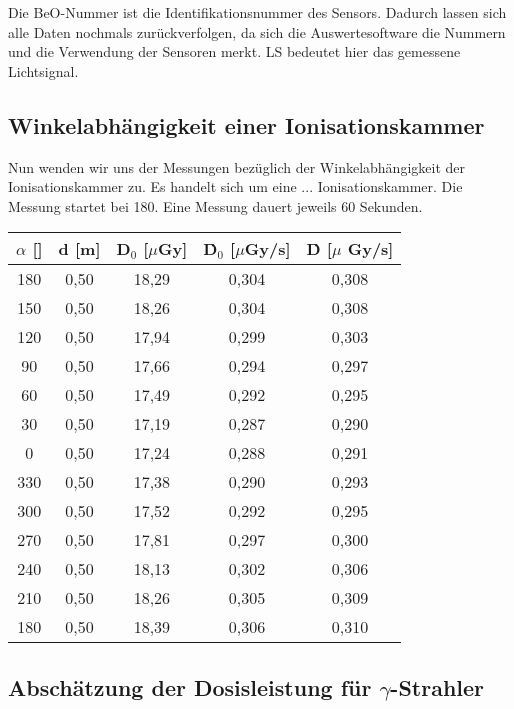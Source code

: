 Die BeO-Nummer ist die Identifikationsnummer des Sensors. Dadurch lassen sich alle Daten nochmals zurückverfolgen, da sich die Auswertesoftware die Nummern und die Verwendung der Sensoren merkt. LS bedeutet hier das gemessene Lichtsignal.
		
\subsection{Winkelabhängigkeit einer Ionisationskammer} \label{sec:Ionkammer}

Nun wenden wir uns der Messungen bezüglich der Winkelabhängigkeit der Ionisationskammer zu. Es handelt sich um eine ... Ionisationskammer. Die Messung startet bei 180\textdegree. Eine Messung dauert jeweils 60 Sekunden.

	\begin{center}
		\begin{tabular}{c|c|c|c|c}
				\textbf{$\alpha$} [\textdegree] & \textbf{d} [m] & \textbf{D$_0$} [$\mu$Gy] & \textbf{\.D$_0$} [$\mu$Gy/s] & \textbf{\.D} [$\mu$ Gy/s] \\ 
		\hline	180 & 0,50 & 18,29 & 0,304 & 0,308 \\ 
				150 & 0,50 & 18,26 & 0,304 & 0,308 \\ 
				120 & 0,50 & 17,94 & 0,299 & 0,303 \\ 
				90  & 0,50 & 17,66 & 0,294 & 0,297 \\ 
				60  & 0,50 & 17,49 & 0,292 & 0,295 \\ 
				30  & 0,50 & 17,19 & 0,287 & 0,290 \\ 
				0   & 0,50 & 17,24 & 0,288 & 0,291 \\ 
				330 & 0,50 & 17,38 & 0,290 & 0,293 \\ 
				300 & 0,50 & 17,52 & 0,292 & 0,295 \\ 
				270 & 0,50 & 17,81 & 0,297 & 0,300 \\ 
				240 & 0,50 & 18,13 & 0,302 & 0,306 \\ 
			    210 & 0,50 & 18,26 & 0,305 & 0,309 \\ 
		\hline	180 & 0,50 & 18,39 & 0,306 & 0,310 \\ 
		\end{tabular} 
	\end{center}
				

\subsection{Abschätzung der Dosisleistung für $\gamma$-Strahler}

